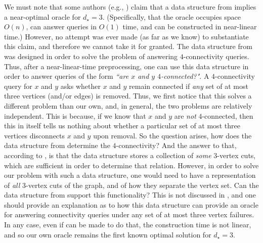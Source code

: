 \documentclass[11pt,a4paper]{article}
\begin{document}
We must note that some authors (e.g., \cite{DBLP:journals/siamcomp/DuanP20, DBLP:conf/focs/LongS22}) claim that a data structure from \cite{DBLP:conf/focs/KanevskyTBC91} implies a near-optimal oracle for $d_{\star}=3$. (Specifically, that the oracle occupies space $O(n)$, can answer queries in $O(1)$ time, and can be constructed in near-linear time.) However, no attempt was ever made (as far as we know) to substantiate this claim, and therefore we cannot take it for granted. The data structure from \cite{DBLP:conf/focs/KanevskyTBC91} was designed in order to solve the problem of answering $4$-connectivity queries. Thus, after a near-linear-time preprocessing, one can use this data structure in order to answer queries of the form \emph{``are $x$ and $y$ $4$-connected?"}. A $4$-connectivity query for $x$ and $y$ asks whether $x$ and $y$ remain connected if \emph{any} set of at most three vertices (and/or edges) is removed. Thus, we first notice that this solves a different problem than our own, and, in general, the two problems are relatively independent. This is because, if we know that $x$ and $y$ are \emph{not} $4$-connected, then this in itself tells us nothing about whether a particular set of at most three vertices disconnects $x$ and $y$ upon removal. So the question arises, how does the data structure from \cite{DBLP:conf/focs/KanevskyTBC91} determine the $4$-connectivity? And the answer to that, according to \cite{DBLP:conf/focs/KanevskyTBC91}, is that the data structure stores a collection of \emph{some} $3$-vertex cuts, which are sufficient in order to determine that relation. However, in order to solve our problem with such a data structure, one would need to have a representation of \emph{all} $3$-vertex cuts of the graph, and of how they separate the vertex set. Can the data structure from \cite{DBLP:conf/focs/KanevskyTBC91} support this functionality? This is not discussed in \cite{DBLP:conf/focs/KanevskyTBC91}, and one should provide an explanation as to how this data structure can provide an oracle for answering connectivity queries under any set of at most three vertex failures. In any case, even if \cite{DBLP:conf/focs/KanevskyTBC91} can be made to do that, the construction time is not linear, and so our own oracle remains the first known optimal solution for $d_{\star}=3$.
 
\end{document}
